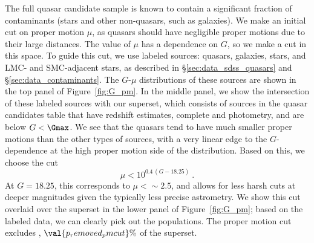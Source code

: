 The full \Gaia quasar candidate sample is known to contain a significant fraction of contaminants (stars and other non-quasars, such as galaxies).
We make an initial cut on proper motion $\mu$, as quasars should have negligible proper motions due to their large distances.
The value of $\mu$ has a dependence on $G$, so we make a cut in this space.
To guide this cut, we use labeled sources: \SDSS quasars, \SDSS galaxies, \SDSS stars, and \Gaia LMC- and SMC-adjacent stars, as described in \S\ref{sec:data_sdss_quasars} and \S\ref{sec:data_contaminants}.
The $G$-$\mu$ distributions of these sources are shown in the top panel of Figure~\ref{fig:G_pm}.
In the middle panel, we show the intersection of these labeled sources with our \cat superset, which consists of sources in the \Gaia quasar candidates table that have \Gaia redshift estimates, complete \Gaia and \unWISE photometry, and are below $G<\Gmax$.
We see that the \SDSS quasars tend to have much smaller proper motions than the other types of sources, with a very linear edge to the $G$-dependence at the high proper motion side of the distribution.
Based on this, we choose the cut
\begin{equation}
    \mu < 10^{0.4\,(G-18.25)} ~.
\end{equation}
At $G=18.25$, this corresponds to $\mu < \sim2.5$, and allows for less harsh cuts at deeper magnitudes given the typically less precise astrometry.
We show this cut overlaid over the \catalog superset in the lower panel of Figure~\ref{fig:G_pm}; based on the labeled data, we can clearly pick out the populations.
The proper motion cut excludes , $\val{p_removed_pmcut}\%$ of the superset.

